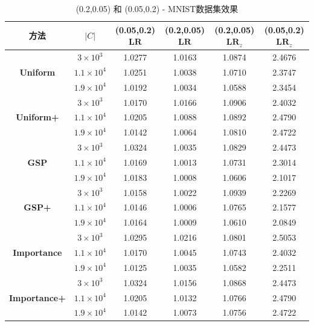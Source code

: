 \begin{table}[h!]
    \centering
    \caption{(0.2,0.05) 和 (0.05,0.2) - MNIST数据集效果}
    \begin{tabular}{|c|c|c|c|c|c|}
    \hline
    \textbf{方法} & $|C|$ & \textbf{(0.05,0.2) $\mathbf{LR}$} & \textbf{(0.2,0.05) $\mathbf{LR}$} & \textbf{(0.2,0.05) $\mathbf{LR}_z$} & \textbf{(0.05,0.2) $\mathbf{LR}_z$} \\
    \hline
    \multirow{3}{*}{\textbf{Uniform}} 
      & $3 \times 10^3$  & 1.0277 & 1.0163 & 1.0874 & 2.4676 \\
    \cline{2-6}
      & $1.1 \times 10^4$ & 1.0251 & 1.0038 & 1.0710 & 2.3747 \\
    \cline{2-6}
      & $1.9 \times 10^4$ & 1.0192 & 1.0034 & 1.0588 & 2.3454 \\
    \hline
    \multirow{3}{*}{\textbf{Uniform+}} 
      & $3 \times 10^3$  & 1.0170 & 1.0166 & 1.0906 & 2.4032 \\
    \cline{2-6}
      & $1.1 \times 10^4$ & 1.0205 & 1.0088 & 1.0892 & 2.4790 \\
    \cline{2-6}
      & $1.9 \times 10^4$ & 1.0142 & 1.0064 & 1.0810 & 2.4722 \\
    \hline
    \multirow{3}{*}{\textbf{GSP}}      
      & $3 \times 10^3$  & 1.0324 & 1.0035 & 1.0829 & 2.4473 \\
    \cline{2-6}
      & $1.1 \times 10^4$ & 1.0169 & 1.0013 & 1.0731 & 2.3014 \\
    \cline{2-6}
      & $1.9 \times 10^4$ & 1.0183 & 1.0008 & 1.0606 & 2.1017 \\
    \hline
    \multirow{3}{*}{\textbf{GSP+}}     
      & $3 \times 10^3$  & 1.0158 & 1.0022 & 1.0939 & 2.2269 \\
    \cline{2-6}
      & $1.1 \times 10^4$ & 1.0146 & 1.0006 & 1.0765 & 2.1577 \\
    \cline{2-6}
      & $1.9 \times 10^4$ & 1.0164 & 1.0009 & 1.0610 & 2.0849 \\
    \hline
    \multirow{3}{*}{\textbf{Importance}} 
      & $3 \times 10^3$  & 1.0295 & 1.0216 & 1.0801 & 2.5053 \\
    \cline{2-6}
      & $1.1 \times 10^4$ & 1.0170 & 1.0045 & 1.0743 & 2.4032 \\
    \cline{2-6}
      & $1.9 \times 10^4$ & 1.0125 & 1.0035 & 1.0582 & 2.2511 \\
    \hline
    \multirow{3}{*}{\textbf{Importance+}} 
      & $3 \times 10^3$  & 1.0324 & 1.0156 & 1.0868 & 2.4473 \\
    \cline{2-6}
      & $1.1 \times 10^4$ & 1.0205 & 1.0132 & 1.0766 & 2.4790 \\
    \cline{2-6}
      & $1.9 \times 10^4$ & 1.0142 & 1.0073 & 1.0756 & 2.4722 \\
    \hline
    \end{tabular}
    \label{tab:mnist_combined}
    \end{table}
    


